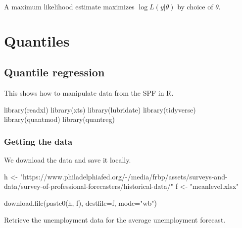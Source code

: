 \documentclass[
  letterpaper,
]{book}
\newenvironment{Shaded}{\begin{snugshade}}{\end{snugshade}}
\newcommand{\AttributeTok}[1]{\textcolor[rgb]{0.40,0.45,0.13}{#1}}
\newcommand{\FunctionTok}[1]{\textcolor[rgb]{0.28,0.35,0.67}{#1}}
\newcommand{\NormalTok}[1]{\textcolor[rgb]{0.00,0.23,0.31}{#1}}
\newcommand{\OtherTok}[1]{\textcolor[rgb]{0.00,0.23,0.31}{#1}}
\newcommand{\StringTok}[1]{\textcolor[rgb]{0.13,0.47,0.30}{#1}}
\begin{document}
A maximum likelihood estimate maximizes \(\log L(y|\theta)\) by choice
of \(\theta\).

\part{Quantiles}

\hypertarget{quantile-regression}{%
\chapter{Quantile regression}\label{quantile-regression}}

This shows how to manipulate data from the SPF in R.

\begin{Shaded}
\begin{Highlighting}[]
\FunctionTok{library}\NormalTok{(readxl)}
\FunctionTok{library}\NormalTok{(xts)}
\FunctionTok{library}\NormalTok{(lubridate)}
\FunctionTok{library}\NormalTok{(tidyverse)}
\FunctionTok{library}\NormalTok{(quantmod)}
\FunctionTok{library}\NormalTok{(quantreg)}
\end{Highlighting}
\end{Shaded}

\hypertarget{getting-the-data}{%
\section{Getting the data}\label{getting-the-data}}

We download the data and save it locally.

\begin{Shaded}
\begin{Highlighting}[]
\NormalTok{h }\OtherTok{\textless{}{-}} \StringTok{"https://www.philadelphiafed.org/{-}/media/frbp/assets/surveys{-}and{-}data/survey{-}of{-}professional{-}forecasters/historical{-}data/"}
\NormalTok{f }\OtherTok{\textless{}{-}} \StringTok{"meanlevel.xlsx"}

\FunctionTok{download.file}\NormalTok{(}\FunctionTok{paste0}\NormalTok{(h, f), }\AttributeTok{destfile=}\NormalTok{f, }\AttributeTok{mode=}\StringTok{"wb"}\NormalTok{)}
\end{Highlighting}
\end{Shaded}

Retrieve the unemployment data for the average unemployment forecast.
\end{document}
